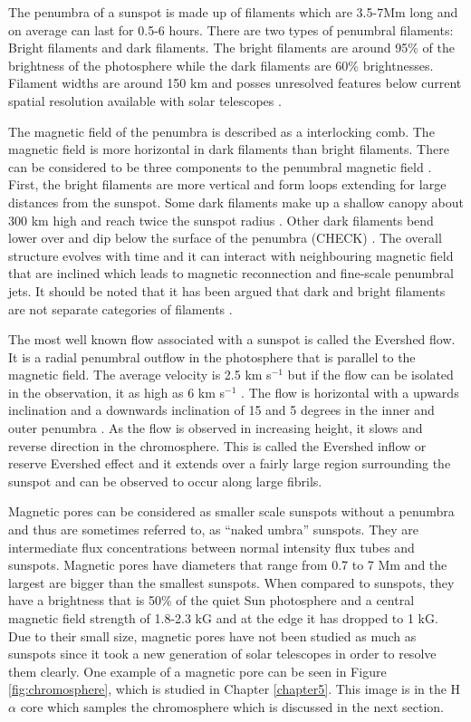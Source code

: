 	The penumbra of a sunspot is made up of filaments which are 3.5-7Mm long and on average can last for 0.5-6 hours.
	There are two types of penumbral filaments: Bright filaments and dark filaments.
	The bright filaments are around 95\% of the brightness of the photosphere while the dark filaments are 60\% brightnesses.
	Filament widths are around 150 km and posses unresolved features below current spatial resolution available with solar telescopes \citep{2002Natur.420..151S,2011Sci...333..316S}.
	
	The magnetic field of the penumbra is described as a interlocking comb.
	The magnetic field is more horizontal in dark filaments than bright filaments.
	There can be considered to be three components to the penumbral magnetic field \citep{2005A&A...436.1087L}.
	First, the bright filaments are more vertical and form loops extending for large distances from the sunspot.
	Some dark filaments make up a shallow canopy about 300 km high and reach twice the sunspot radius \cite{1991A&A...252..821D}.
	Other dark filaments bend lower over and dip below the surface of the penumbra (CHECK) \citep{1993ApJ...403..780T}.
	The overall structure evolves with time and it can interact with neighbouring magnetic field that are inclined which leads to magnetic reconnection and fine-scale penumbral jets.
	It should be noted that it has been argued that dark and bright filaments are not separate categories of filaments \citep{2013A&A...557A..25T}.
	
	The most well known flow associated with a sunspot is called the Evershed flow.
	It is a radial penumbral outflow in the photosphere that is parallel to the magnetic field.
	The average velocity is 2.5 km s$^{-1}$ but if the flow can be isolated in the observation, it as high as 6 km s$^{-1}$ \citep{2003A&A...403L..47B}.
	The flow is horizontal with a upwards inclination and a downwards inclination of 15 and 5 degrees in the inner and outer penumbra \citep{2004A&A...415..717T}.
	As the flow is observed in increasing height, it slows and reverse direction in the chromosphere.
	This is called the Evershed inflow or reserve Evershed effect and it extends over a fairly large region surrounding the sunspot and can be observed to occur along large fibrils.
	
    Magnetic pores can be considered as smaller scale sunspots without a penumbra and thus are sometimes referred to, as ``naked umbra'' sunspots.
    They are intermediate flux concentrations between normal intensity flux tubes and sunspots.
	Magnetic pores have diameters that range from 0.7 to 7 Mm and the largest are bigger than the smallest sunspots.
	When compared to sunspots, they have a brightness that is 50\% of the quiet Sun photosphere and a central magnetic field strength of 1.8-2.3 kG and at the edge it has dropped to 1 kG.
    Due to their small size, magnetic pores have not been studied as much as sunspots since it took a new generation of solar telescopes in order to resolve them clearly.
    One example of a magnetic pore can be seen in Figure \ref{fig:chromosphere}, which is studied in Chapter \ref{chapter5}.
    This image is in the H$\alpha$ core which samples the chromosphere which is discussed in the next section.

